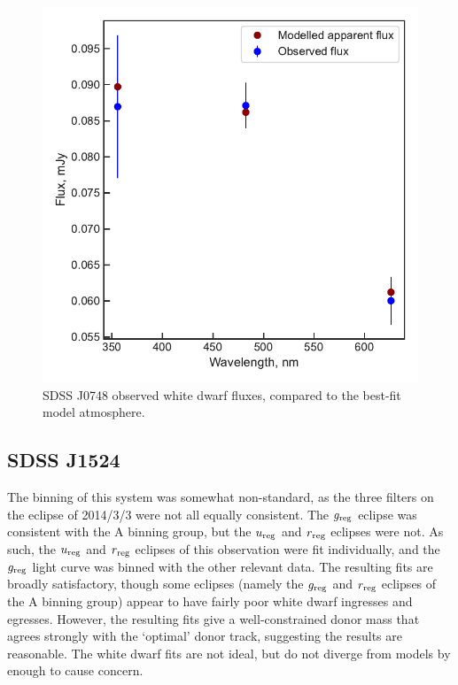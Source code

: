 \begin{figure}
    \centering
    \includegraphics[width=\textwidth]{figures/results/SDSS0748/fluxplot.pdf}
    \caption{SDSS J0748 observed white dwarf fluxes, compared to the best-fit model atmosphere.}
    \label{fig:SDSS0748 flux plot}
\end{figure}
\clearpage



\newpage
\subsection{SDSS J1524}

The binning of this system was somewhat non-standard, as the three filters on the eclipse of 2014/3/3 were not all equally consistent. The $g_{\rm reg}$ eclipse was consistent with the A binning group, but the $u_{\rm reg}$ and $r_{\rm reg}$ eclipses were not.
As such, the $u_{\rm reg}$ and $r_{\rm reg}$ eclipses of this observation were fit individually, and the $g_{\rm reg}$ light curve was binned with the other relevant data.
The resulting fits are broadly satisfactory, though some eclipses (namely the $g_{\rm reg}$ and $r_{\rm reg}$ eclipses of the A binning group) appear to have fairly poor white dwarf ingresses and egresses.
However, the resulting fits give a well-constrained donor mass that agrees strongly with the `optimal' \citet{knigge11} donor track, suggesting the results are reasonable. The white dwarf fits are not ideal, but do not diverge from models by enough to cause concern.




